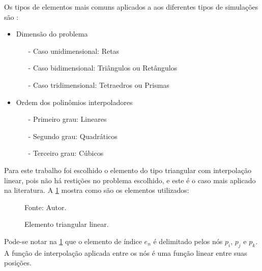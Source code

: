 Os tipos de elementos mais comuns aplicados a aos diferentes tipos de simulações são \cite{gustavo}:
\begin{itemize}
    \item Dimensão do problema
    \begin{itemize}
        \item[-] Caso unidimensional: Retas
        \item[-] Caso bidimensional: Triângulos ou Retângulos
        \item[-] Caso tridimensional: Tetraedros ou Prismas
    \end{itemize}
    \item Ordem dos polinômios interpoladores
    \begin{itemize}
        \item[-] Primeiro grau: Lineares 
        \item[-] Segundo grau: Quadráticos
        \item[-] Terceiro grau: Cúbicos
    \end{itemize}
\end{itemize}

Para este trabalho foi escolhido o elemento do tipo triangular com interpolação linear, pois não há restições no problema escolhido, e este é o caso mais aplicado na literatura.
A \ref{element} mostra como são os elementos utilizados:
\begin{figure}[H]
    \centering
     {\raggedleft \scriptsize Fonte: Autor.}
    \caption{Elemento triangular linear.}
    \label{element}
\end{figure}

Pode-se notar na \ref{element} que o elemento de índice $e_n$ é delimitado pelos nós $p_i$, $p_j$ e $p_k$.
A função de interpolação aplicada entre os nós é uma função linear entre suas posições.

